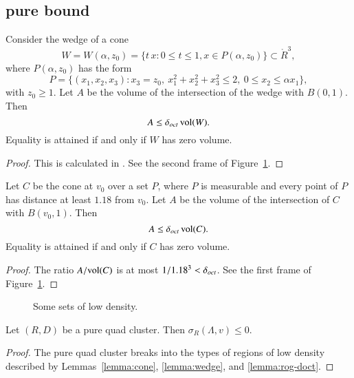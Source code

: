 \subsection{pure bound}%



\begin{lemma} \label{lemma:wedge} Consider the wedge of a cone
    $$
    W =W(\alpha,z_0) =
    \{ t\, x : 0\le t \le 1, x\in P(\alpha,z_0)\}\subset\ring{R}^3,
    $$
where $P(\alpha,z_0)$ has the form
    $$
    P = \{(x_1,x_2,x_3) :
    x_3 = z_0,\   x_1^2+x_2^2+x_3^2\le 2,\ 0\le x_2\le \alpha x_1\},
    $$
with $z_0\ge1$.  Let $A$ be the volume of the intersection of the
wedge with $B(0,1)$. Then
    $$A\le\delta_{oct}\,{\operatorname{vol}}(W).$$
Equality is attained if and only if $W$ has zero volume.
\end{lemma}

\begin{proof} This is calculated in \cite[Sec. 4]{part2}.  See the
second frame of Figure~\ref{fig:doct}.
\end{proof}

\begin{lemma} \label{lemma:cone}
Let $C$ be the cone at $v_0$ over a set $P$, where $P$ is
measurable and every point of $P$ has distance at least $1.18$
from $v_0$.  Let $A$ be the volume of the intersection of $C$
with $B(v_0,1)$. Then
    $$A\le\delta_{oct}\,{\operatorname{vol}}(C).$$
Equality is attained if and only if $C$ has zero volume.
\end{lemma}

\begin{proof} The ratio $A/{\operatorname{vol}}(C)$ is at most $1/1.18^3 < \delta_{oct}$.   See the
first frame of Figure~\ref{fig:doct}.
\end{proof}

\begin{figure}[htb]
  \centering
  \caption{Some sets of low density.}
  \label{fig:doct}
\end{figure}

\begin{lemma}\label{lemma:pure0}
Let $(R,D)$ be a pure quad cluster.  Then
  $\sigma_R(\Lambda,v)\le 0$.
\end{lemma}

\begin{proof}  The pure quad cluster breaks into the types
of regions of low density described by Lemmas~\ref{lemma:cone},
\ref{lemma:wedge}, and \ref{lemma:rog-doct}.
\end{proof}




